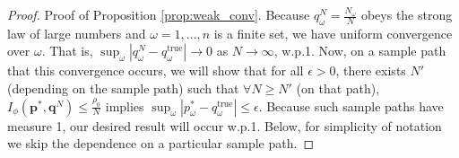 \documentclass[opre,nonblindrev]{informs3} %
\newcommand{\q}{\mathbf{q}}
\newcommand{\p}{\mathbf{p}}
\begin{document}
\begin{proof}{\sc Proof of Proposition \ref{prop:weak_conv}.}
	Because $q_\omega^N=\frac{N_\omega}{N}$ obeys the strong law of large numbers and $\omega =1,...,n$ is a finite set, we have uniform convergence over $\omega$. 
	That is, $\sup_\omega |q^N_{\omega} - q^{\text{true}}_\omega| \rightarrow 0$ as $N \rightarrow \infty$, w.p.1.
	Now, on a sample path that this convergence occurs, we will show that for all $\epsilon > 0$, there exists $N'$  (depending on the sample path) such that $\forall N \geq N'$ (on that path), $I_{\phi}(\p^*,\q^N) \leq \frac{\rho_0}{N}$ implies $\sup_\omega |p^*_\omega - q^{\text{true}}_\omega| \leq \epsilon$.
	Because such sample paths have measure 1, our desired result will occur w.p.1. 
	Below, for simplicity of notation we skip the dependence on a particular sample path.



\end{proof}
\end{document}
